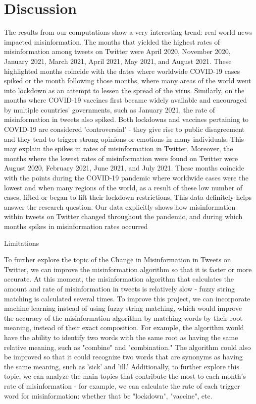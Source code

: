 \documentclass[fontsize=11pt]{article}
\begin{document}
    \section*{Discussion}
    \begin{flushleft}

        The results from our computations show a very interesting trend: real world news impacted misinformation. The months that yielded the highest rates of misinformation among tweets on Twitter were April 2020, November 2020, January 2021, March 2021, April 2021, May 2021, and August 2021. These highlighted months coincide with the dates where worldwide COVID-19 cases spiked or the month following those months, where many areas of the world went into lockdown as an attempt to lessen the spread of the virus. Similarly, on the months where COVID-19 vaccines first became widely available and encouraged by multiple countries' governments, such as January 2021, the rate of misinformation in tweets also spiked. Both lockdowns and vaccines pertaining to COVID-19 are considered 'controversial' - they give rise to public disagreement and they tend to trigger strong opinions or emotions in many individuals. This may explain the spikes in rates of misinformation in Twitter. Moreover, the months where the lowest rates of misinformation were found on Twitter were August 2020, February 2021, June 2021, and July 2021. These months coincide with the points during the COVID-19 pandemic where worldwide cases were the lowest and when many regions of the world, as a result of these low number of cases, lifted or began to lift their lockdown restrictions. This data definitely helps answer the research question. Our data explicitly shows how misinformation within tweets on Twitter changed throughout the pandemic, and during which months spikes in misinformation rates occurred\hfill\break

        Limitations\hfill\break

        To further explore the topic of the Change in Misinformation in Tweets on Twitter, we can improve the misinformation algorithm so that it is faster or more accurate. At this moment, the misinformation algorithm that calculates the amount and rate of misinformation in tweets is relatively slow - fuzzy string matching is calculated several times. To improve this project, we can incorporate machine learning instead of using fuzzy string matching, which would improve the accuracy of the misinformation algorithm by matching words by their root meaning, instead of their exact composition. For example, the algorithm would have the ability to identify two words with the same root as having the same relative meaning, such as "combine" and "combination." The algorithm could also be improved so that it could recognize two words that are synonyms as having the same meaning, such as 'sick' and 'ill.' Additionally, to further explore this topic, we can analyze the main topics that contribute the most to each month's rate of misinformation - for example, we can calculate the rate of each trigger word for misinformation: whether that be "lockdown", "vaccine", etc.

    \end{flushleft}
\end{document}
